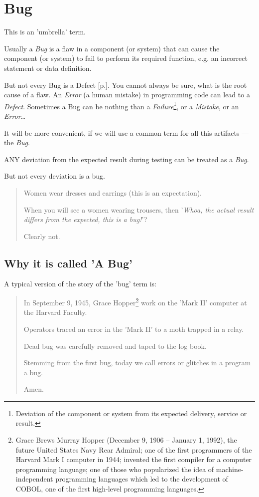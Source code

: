 \section{Bug}
\label{sec:Bug}

This is an 'umbrella' term.

Usually a \emph{Bug} is a flaw in a component (or system) that can cause the component (or system) to fail to perform its required function, e.g. an incorrect statement or data definition.

But not every Bug is a Defect [p.\pageref{sec:Defect}]. You cannot always be sure, what is the root cause of a flaw. An \emph{Error} (a human mistake) in programming code can lead to a \emph{Defect}. Sometimes a Bug can be nothing than a \emph{Failure}\footnote{Deviation of the component or system from its expected delivery, service or result.}, or a \emph{Mistake}, or an \emph{Error}\ldots 

It will be more convenient, if we will use a common term for all this artifacts — the \emph{Bug}.

ANY deviation from the expected result during testing can be treated as a \emph{Bug}. 

But not every deviation is a bug.

\begin{quote}
Women wear dresses and earrings (this is an expectation). 

When you will see a women wearing trousers, then '\textit{Whoa, the actual result differs from the expected, this is a bug!}'? 

Clearly not.
\end{quote} 

\subsection{Why it is called 'A Bug'}

A typical version of the story of the 'bug' term is:

\begin{quote}
In September 9, 1945, Grace Hopper\footnote{Grace Brews Murray Hopper (December 9, 1906 – January 1, 1992), the future United States Navy Rear Admiral; one of the first programmers of the Harvard Mark I computer in 1944; invented the first compiler for a computer programming language; one of those who popularized the idea of machine-independent programming languages which led to the development of COBOL, one of the first high-level programming languages.} work on the 'Mark II' computer at the Harvard Faculty.

Operators traced an error in the 'Mark II' to a moth trapped in a relay. 

Dead bug was carefully removed and taped to the log book. 

Stemming from the first bug, today we call errors or glitches in a program a bug.

Amen.
\end{quote} 

